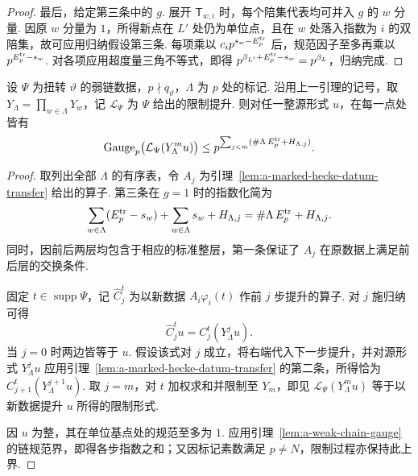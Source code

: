 \begin{proof}
最后，给定第三条中的 $g$. 展开 $\mathsf T_{w,i}$ 时，每个陪集代表均可并入 $g$ 的 $w$ 分量. 因原 $w$ 分量为 $1$，所得新点在 $L'$ 处仍为单位点，且在 $w$ 处落入指数为 $i$ 的双陪集，故可应用归纳假设第三条. 每项乘以 $c_i p^{s_w-E_p^{\rm tr}}$ 后，规范因子至多再乘以 $p^{E_p^{\rm tr}-s_w}$. 对各项应用超度量三角不等式，即得
$p^{\beta_{L'}+E_p^{\rm tr}-s_w}=p^{\beta_L}$，归纳完成.
\end{proof}

\begin{lemma}
\label{lem:a-marked-hecke-chain-gauge}
\emitthmsource
设 $\Psi$ 为扭转 $\vartheta$ 的弱链数据，$p\nmid q_\vartheta$，$\Lambda$ 为 $p$ 处的标记. 沿用上一引理的记号，取 $Y_\Lambda=\prod_{w\in\Lambda}Y_w$，记 $\mathcal L_\Psi$ 为 $\Psi$ 给出的限制提升. 则对任一整源形式 $u$，在每一点处皆有
\[
 \operatorname{Gauge}_p\bigl(\mathcal L_\Psi(Y_\Lambda^m u)\bigr)
 \le p^{\sum_{j<m}(\#\Lambda\,E_p^{\rm tr}+H_{\Lambda,j})}.
\]
\end{lemma}
\begin{proof}
取列出全部 $\Lambda$ 的有序表，令 $A_j$ 为引理~\ref{lem:a-marked-hecke-datum-transfer} 给出的算子. 第三条在 $g=1$ 时的指数化简为
\[
 \sum_{w\in\Lambda}(E_p^{\rm tr}-s_w)+\sum_{w\in\Lambda}s_w+
 H_{\Lambda,j}=\#\Lambda\,E_p^{\rm tr}+H_{\Lambda,j}.
\]
同时，因前后两层均包含于相应的标准整层，第一条保证了 $A_j$ 在原数据上满足前后层的交换条件.

固定 $t\in\operatorname{supp}\Psi$，记 $\widehat C_j^t$ 为以新数据 $A_i\varphi_i(t)$ 作前 $j$ 步提升的算子. 对 $j$ 施归纳可得
\[
 \widehat C_j^t u=C_j^t(Y_\Lambda^j u).
\]
当 $j=0$ 时两边皆等于 $u$. 假设该式对 $j$ 成立，将右端代入下一步提升，并对源形式 $Y_\Lambda^ju$ 应用引理~\ref{lem:a-marked-hecke-datum-transfer} 的第二条，所得恰为 $C_{j+1}^t(Y_\Lambda^{j+1}u)$. 取 $j=m$，对 $t$ 加权求和并限制至 $Y_m$，即见 $\mathcal L_\Psi(Y_\Lambda^mu)$ 等于以新数据提升 $u$ 所得的限制形式.

因 $u$ 为整，其在单位基点处的规范至多为 $1$. 应用引理~\ref{lem:a-weak-chain-gauge} 的链规范界，即得各步指数之和；又因标记素数满足 $p\ne N$，限制过程亦保持此上界.
\end{proof}

